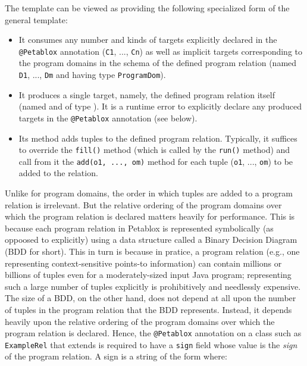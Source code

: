 The  template can be viewed as providing the following
specialized form of the general  template:

\begin{itemize}
\item
It consumes any number and kinds of targets explicitly declared in the
{\tt @Petablox} annotation ({\tt C1}, ..., {\tt Cn}) as well as implicit targets
corresponding to the program domains in the schema of the defined program
relation (named {\tt D1}, ..., {\tt Dm} and having type {\tt ProgramDom}).
\item
It produces a single target, namely, the defined program relation itself
(named  and of type ).  It is a runtime error
to explicitly declare any produced targets in the {\tt @Petablox} annotation (see
below).
\item
Its  method adds tuples to the defined program relation.  Typically,
it suffices to override the {\tt fill()} method (which is called by the
{\tt run()} method) and call from it the {\tt add(o1, ..., om)} method for each
tuple ({\tt o1}, ..., {\tt om}) to be added to the relation.
\end{itemize}

Unlike for program domains, the order in which tuples are added to a program
relation is irrelevant.  But the relative ordering of the program domains over
which the program relation is declared matters heavily for performance.
This is because each program relation in Petablox is represented symbolically (as
oppoosed to explicitly) using a data structure called a Binary Decision Diagram
(BDD for short).  This in turn is because in pratice, a program relation (e.g.,
one representing context-sensitive points-to information)
can contain millions or billions of tuples even for a moderately-sized
input Java program; representing such a large number of tuples explicitly is
prohibitively and needlessly expensive.  The size of a BDD, on the other hand,
does not depend at all upon the number of tuples in the program relation that
the BDD represents.  Instead, it depends heavily upon the relative ordering
of the program domains over which the program relation is declared.
Hence, the {\tt @Petablox} annotation on a class such as {\tt ExampleRel} that
extends  is required to have a {\tt sign} field whose value is
the {\it sign} of the program relation.
A sign is a string of the form  where:


